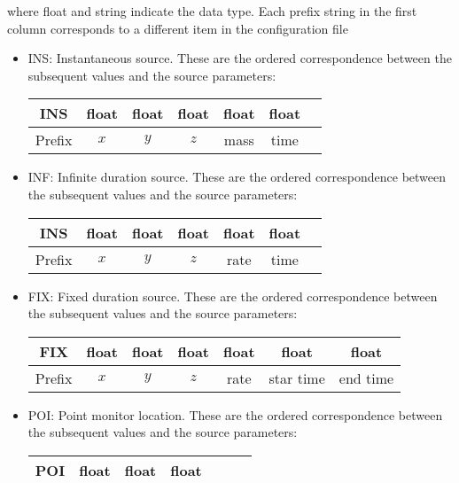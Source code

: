 \documentclass[]{article}
\begin{document}
\noindent where float and string indicate the data type. Each prefix string in the first
column corresponds to a different item in the configuration file
\begin{itemize}
    \item INS: Instantaneous source. These are the ordered correspondence
    between the subsequent values and the source parameters:
    \begin{center}
        \begin{tabular}{|c|c|c|c|c|c|c|}\hline
            INS & float & float & float & float & float & \\\hline
            Prefix & $x$ & $y$ & $z$ & mass & time & \\\hline
        \end{tabular}
    \end{center}
    \item INF: Infinite duration source. These are the ordered correspondence
    between the subsequent values and the source parameters:
    \begin{center}
        \begin{tabular}{|c|c|c|c|c|c|c|}\hline
            INS & float & float & float & float & float & \\\hline
            Prefix & $x$ & $y$ & $z$ & rate & time & \\\hline
        \end{tabular}
    \end{center}
    \item FIX: Fixed duration source. These are the ordered correspondence
    between the subsequent values and the source parameters:
    \begin{center}
        \begin{tabular}{|c|c|c|c|c|c|c|}\hline
            FIX & float & float & float & float & float & float \\\hline
            Prefix & $x$ & $y$ & $z$ & rate & star time & end time\\\hline
        \end{tabular}
    \end{center}
    \item POI: Point monitor location. These are the ordered correspondence
    between the subsequent values and the source parameters:
    \begin{center}
        \begin{tabular}{|c|c|c|c|c|c|c|}\hline
            POI & float & float & float &  &  & \\\hline

\end{tabular}
\end{center}
\end{itemize}
\end{document}
